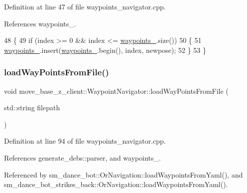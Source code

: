Definition at line 47 of file waypoints\+\_\+navigator.\+cpp.



References waypoints\+\_\+.


\begin{DoxyCode}
48 \{
49   \textcolor{keywordflow}{if} (index >= 0 && index <= \hyperlink{classmove__base__z__client_1_1WaypointNavigator_a83e4e39987eaf1c8856d32d581eb4cd0}{waypoints\_}.size())
50   \{
51     \hyperlink{classmove__base__z__client_1_1WaypointNavigator_a83e4e39987eaf1c8856d32d581eb4cd0}{waypoints\_}.insert(\hyperlink{classmove__base__z__client_1_1WaypointNavigator_a83e4e39987eaf1c8856d32d581eb4cd0}{waypoints\_}.begin(), index, newpose);
52   \}
53 \}
\end{DoxyCode}
\mbox{\label{classmove__base__z__client_1_1WaypointNavigator_af56d146945280a8660805aad7eb3aed9}} 
\subsubsection{\texorpdfstring{load\+Way\+Points\+From\+File()}{loadWayPointsFromFile()}}
{\footnotesize\ttfamily void move\+\_\+base\+\_\+z\+\_\+client\+::\+Waypoint\+Navigator\+::load\+Way\+Points\+From\+File (\begin{DoxyParamCaption}\item[{std\+::string}]{filepath }\end{DoxyParamCaption})}



Definition at line 94 of file waypoints\+\_\+navigator.\+cpp.



References generate\+\_\+debs\+::parser, and waypoints\+\_\+.



Referenced by sm\+\_\+dance\+\_\+bot\+::\+Or\+Navigation\+::load\+Waypoints\+From\+Yaml(), and sm\+\_\+dance\+\_\+bot\+\_\+strikes\+\_\+back\+::\+Or\+Navigation\+::load\+Waypoints\+From\+Yaml().



